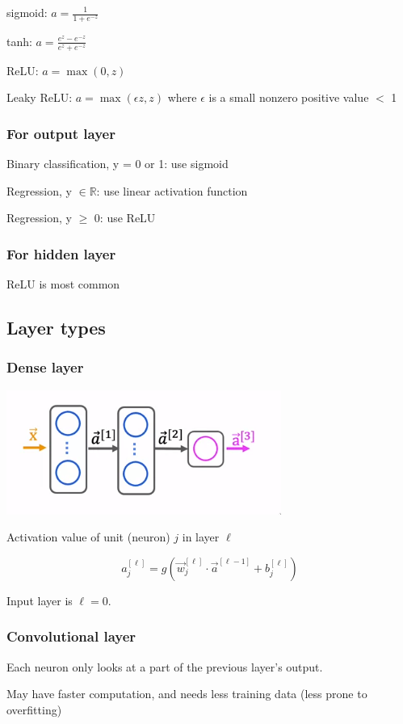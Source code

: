 \documentclass[12pt]{article}
\begin{document}
sigmoid: $a = \frac{1}{1 + e^{-z}}$

tanh: $a = \frac{e^z - e^{-z}}{e^z + e^{-z}}$

ReLU: $a = \max(0, z)$

Leaky ReLU: $a = \max(\epsilon z, z)$ where $\epsilon$ is a small nonzero positive value $<$ 1

\subsubsection*{For output layer}

Binary classification, y = 0 or 1: use sigmoid

Regression, y $\in \mathbb{R}$: use linear activation function

Regression, y $\geq$ 0: use ReLU

\subsubsection*{For hidden layer}

ReLU is most common

\subsection{Layer types}

\subsubsection*{Dense layer}

\includegraphics{nn/dense_layer}

Activation value of unit (neuron) $j$ in layer $\ell$

\[ a_j^{[\ell]} = g(\vec{w}_j^{[\ell]} \cdot \vec{a}^{[\ell - 1]} + b_j^{[\ell]}) \]

Input layer is $\ell = 0$.

\subsubsection*{Convolutional layer}

Each neuron only looks at a part of the previous layer's output.

May have faster computation, and needs less training data (less prone to overfitting)
\end{document}

